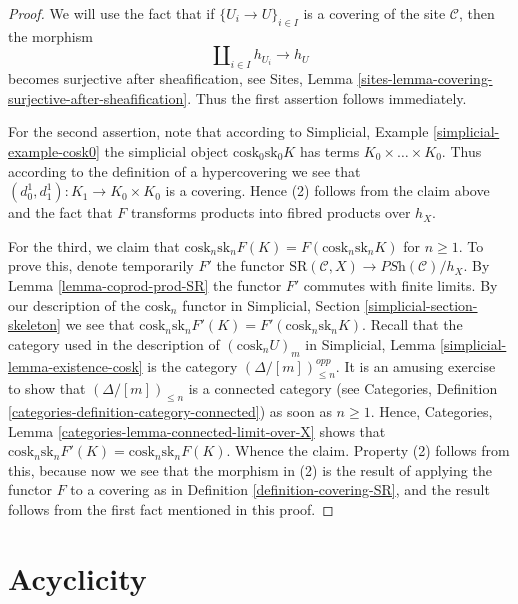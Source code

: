 \documentclass{stacks-project}
\theoremstyle{plain}
\theoremstyle{definition}
\theoremstyle{remark}
\numberwithin{equation}{subsection}
\begin{document}
\begin{proof}
We will use the fact that if
$\{U_i \to U\}_{i \in I}$ is a covering of the site
$\mathcal{C}$, then the morphism
$$
\amalg_{i \in I} h_{U_i} \to h_U
$$
becomes surjective after sheafification, see
Sites, Lemma \ref{sites-lemma-covering-surjective-after-sheafification}.
Thus the first assertion follows immediately.

\medskip\noindent
For the second assertion, note that according to
Simplicial, Example \ref{simplicial-example-cosk0}
the simplicial object $\text{cosk}_0 \text{sk}_0 K$
has terms $K_0 \times \ldots \times K_0$. Thus
according to the definition of a hypercovering we
see that $(d^1_0, d^1_1) : K_1 \to K_0 \times K_0$ is a
covering. Hence (2) follows from the claim above
and the fact that $F$ transforms products into fibred
products over $h_X$.

\medskip\noindent
For the third, we claim that
$\text{cosk}_n \text{sk}_n F(K) =
F(\text{cosk}_n \text{sk}_n K)$ for $n \geq 1$.
To prove this, denote temporarily $F'$ the functor
$\text{SR}(\mathcal{C}, X) \to \textit{PSh}(\mathcal{C})/h_X$.
By Lemma \ref{lemma-coprod-prod-SR} the functor
$F'$ commutes with finite limits.
By our description of the $\text{cosk}_n$ functor in
Simplicial, Section \ref{simplicial-section-skeleton}
we see that $\text{cosk}_n \text{sk}_n F'(K) =
F'(\text{cosk}_n \text{sk}_n K)$.
Recall that the category used in the description of
$(\text{cosk}_n U)_m$ in
Simplicial, Lemma \ref{simplicial-lemma-existence-cosk}
is the category $(\Delta/[m])^{opp}_{\leq n}$. It is an
amusing exercise to show that $(\Delta/[m])_{\leq n}$ is
a connected category (see
Categories, Definition \ref{categories-definition-category-connected})
as soon as $n \geq 1$. Hence,
Categories, Lemma \ref{categories-lemma-connected-limit-over-X}
shows that $\text{cosk}_n \text{sk}_n F'(K) =
\text{cosk}_n \text{sk}_n F(K)$. Whence the claim.
Property (2) follows from this, because now we see that
the morphism in (2) is the result of applying the
functor $F$ to a covering as in Definition \ref{definition-covering-SR},
and the result follows from the first fact mentioned
in this proof.
\end{proof}



\section{Acyclicity}
\label{section-acyclicity}
\end{document}
